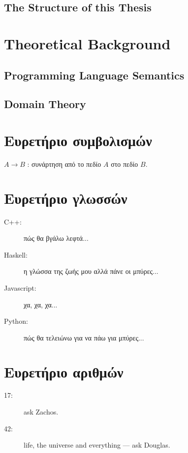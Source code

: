 \documentclass[diploma]{softlab-thesis}
\begin{document}
\section{The Structure of this Thesis}

\chapter{Theoretical Background}

\section{Programming Language Semantics}

\section{Domain Theory}




\nocite{*}






\backmatter

\appendix

\chapter{Ευρετήριο συμβολισμών}

$A \rightarrow B$ : συνάρτηση από το πεδίο $A$ στο πεδίο $B$.

\chapter{Ευρετήριο γλωσσών}

\begin{description}
\item[C++:] πώς θα βγάλω λεφτά...
\item[Haskell:] η γλώσσα της ζωής μου αλλά πάνε οι μπύρες...
\item[Javascript:] χα, χα, χα...
\item[Python:] πώς θα τελειώνω για να πάω για μπύρες...
\end{description}


\chapter{Ευρετήριο αριθμών}

\begin{description}
\item[17:] ask Zachos.
\item[42:] life, the universe and everything --- ask Douglas.
\end{description}


\end{document}
